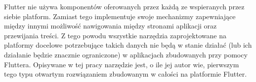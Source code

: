 Flutter nie używa komponentów oferowanych przez każdą ze wspieranych przez siebie platform. Zamiast tego implementuje swoje mechanizmy zapewniające między innymi możliwość nawigowania między stronami aplikacji oraz przewijania treści. Z tego powodu wszystkie narzędzia zaprojektowane na platformy docelowe potrzebujące takich danych nie będą w stanie działać (lub ich działanie będzie znacznie ograniczone) w aplikacjach zbudowanych przy pomocy Fluttera. Opisywane w tej pracy narzędzie jest, o ile jej autor wie, pierwszym tego typu otwartym rozwiązaniem zbudowanym w całości na platformie Flutter.


